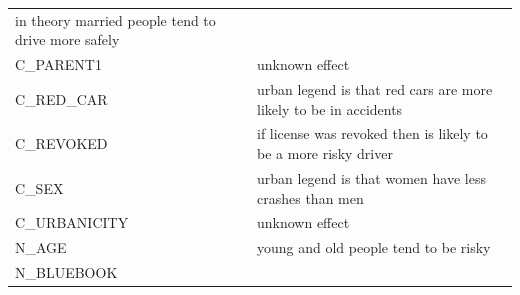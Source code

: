 \documentclass[]{article}
\begin{document}
\begin{longtable}[]{@{}ll@{}}
\begin{minipage}[t]{0.76\columnwidth}
in theory married people tend to drive more safely
\strut\end{minipage}\tabularnewline
\begin{minipage}[t]{0.18\columnwidth}\raggedright\strut
C\_PARENT1
\strut\end{minipage} &
\begin{minipage}[t]{0.76\columnwidth}\raggedright\strut
unknown effect
\strut\end{minipage}\tabularnewline
\begin{minipage}[t]{0.18\columnwidth}\raggedright\strut
C\_RED\_CAR
\strut\end{minipage} &
\begin{minipage}[t]{0.76\columnwidth}\raggedright\strut
urban legend is that red cars are more likely to be in accidents
\strut\end{minipage}\tabularnewline
\begin{minipage}[t]{0.18\columnwidth}\raggedright\strut
C\_REVOKED
\strut\end{minipage} &
\begin{minipage}[t]{0.76\columnwidth}\raggedright\strut
if license was revoked then is likely to be a more risky driver
\strut\end{minipage}\tabularnewline
\begin{minipage}[t]{0.18\columnwidth}\raggedright\strut
C\_SEX
\strut\end{minipage} &
\begin{minipage}[t]{0.76\columnwidth}\raggedright\strut
urban legend is that women have less crashes than men
\strut\end{minipage}\tabularnewline
\begin{minipage}[t]{0.18\columnwidth}\raggedright\strut
C\_URBANICITY
\strut\end{minipage} &
\begin{minipage}[t]{0.76\columnwidth}\raggedright\strut
unknown effect
\strut\end{minipage}\tabularnewline
\begin{minipage}[t]{0.18\columnwidth}\raggedright\strut
N\_AGE
\strut\end{minipage} &
\begin{minipage}[t]{0.76\columnwidth}\raggedright\strut
young and old people tend to be risky
\strut\end{minipage}\tabularnewline
\begin{minipage}[t]{0.18\columnwidth}\raggedright\strut
N\_BLUEBOOK
\strut\end{minipage} &
\begin{minipage}[t]{0.76\columnwidth}\raggedright\strut

\end{minipage}
\end{longtable}
\end{document}
